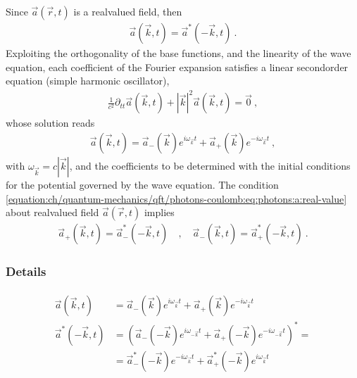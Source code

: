 \documentclass[letterpaper,10pt,english]{jupyterBook}
\begin{document}
\sphinxAtStartPar
{} Since \(\vec{a}(\vec{r},t)\) is a real\sphinxhyphen{}valued field, then
\begin{equation}\label{equation:ch/quantum-mechanics/qft/photons-coulomb:eq:photons:a:real-value}
\begin{split}\vec{a}(\vec{k},t) = \vec{a}^*(-\vec{k},t) \ . \end{split}
\end{equation}
\sphinxAtStartPar
{} Exploiting the orthogonality of the base functions, and the linearity of the wave equation, each coefficient of the Fourier expansion satisfies a linear second\sphinxhyphen{}order equation (simple harmonic oscillator),
\begin{equation*}
\begin{split}\frac{1}{c^2}\partial_{tt} \vec{a}(\vec{k}, t) + |\vec{k}|^2 \vec{a}(\vec{k},t) = \vec{0} \ ,\end{split}
\end{equation*}
\sphinxAtStartPar
whose solution reads
\begin{equation*}
\begin{split}\vec{a}(\vec{k},t) = \vec{a}_{-}(\vec{k}) e^{i \omega_{\vec{k}} t} + \vec{a}_{+}(\vec{k}) e^{- i \omega_{\vec{k}} t} \ ,\end{split}
\end{equation*}
\sphinxAtStartPar
with \(\omega_{\vec{k}} = c | \vec{k} |\), and the coefficients to be determined with the initial conditions for the potential governed by the wave equation. The condition \eqref{equation:ch/quantum-mechanics/qft/photons-coulomb:eq:photons:a:real-value} about real\sphinxhyphen{}valued field \(\vec{a}(\vec{r},t)\) implies
\begin{equation*}
\begin{split}\vec{a}_+(\vec{k},t) = \vec{a}^*_-(-\vec{k},t) \quad , \quad \vec{a}_-(\vec{k},t) = \vec{a}^*_+(-\vec{k},t) \ .\end{split}
\end{equation*}\subsubsection*{Details}
\begin{equation*}
\begin{split}\begin{aligned}
  \vec{a}(\vec{k},t) & = \vec{a}_{-}(\vec{k}) e^{i \omega_{\vec{k}} t} + \vec{a}_{+}(\vec{k}) e^{- i \omega_{\vec{k}} t} \\
  \vec{a}^*(-\vec{k},t) & = \left( \vec{a}_{-}(-\vec{k}) e^{i \omega_{-\vec{k}} t} + \vec{a}_{+}(-\vec{k}) e^{- i \omega_{-\vec{k}} t} \right)^* = \\
                        & =        \vec{a}_{-}^*(-\vec{k}) e^{-i \omega_{\vec{k}} t} + \vec{a}^*_{+}(-\vec{k}) e^{i \omega_{\vec{k}} t} \\
\end{aligned}\end{split}
\end{equation*}
\end{document}
